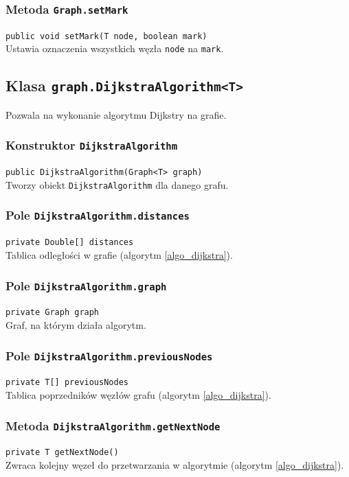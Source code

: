 \documentclass{article}
\begin{document}
\subsubsection{Metoda \texttt{Graph.setMark}}
\texttt{public void setMark(T node, boolean mark)} \\
Ustawia oznaczenia wszystkich węzła \texttt{node} na \texttt{mark}.

\subsection{Klasa \texttt{graph.DijkstraAlgorithm<T>}}
Pozwala na wykonanie algorytmu Dijkstry na grafie.

\subsubsection{Konstruktor \texttt{DijkstraAlgorithm}}
\texttt{public DijkstraAlgorithm(Graph<T> graph)} \\
Tworzy obiekt \texttt{DijkstraAlgorithm} dla danego grafu.

\subsubsection{Pole \texttt{DijkstraAlgorithm.distances}}
\texttt{private Double[] distances} \\
Tablica odległości w grafie (algorytm \ref{algo_dijkstra}).

\subsubsection{Pole \texttt{DijkstraAlgorithm.graph}}
\texttt{private Graph graph} \\
Graf, na którym działa algorytm.

\subsubsection{Pole \texttt{DijkstraAlgorithm.previousNodes}}
\texttt{private T[] previousNodes} \\
Tablica poprzedników węzłów grafu (algorytm \ref{algo_dijkstra}).

\subsubsection{Metoda \texttt{DijkstraAlgorithm.getNextNode}}
\texttt{private T getNextNode()} \\
Zwraca kolejny węzeł do przetwarzania w algorytmie (algorytm \ref{algo_dijkstra}).
\end{document}
